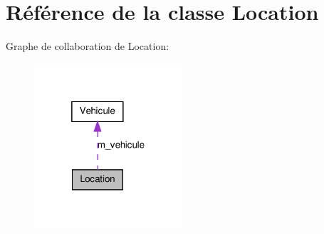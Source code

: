 \hypertarget{class_location}{
\section{Référence de la classe Location}
\label{class_location}
}


Graphe de collaboration de Location:
\nopagebreak
\begin{figure}[H]
\begin{center}
\leavevmode
\includegraphics[width=157pt]{class_location__coll__graph}
\end{center}
\end{figure}
